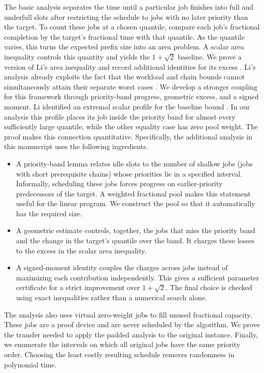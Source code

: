 The basic analysis separates the time until a particular job finishes
into full and underfull slots after restricting the schedule to jobs with
no later priority than the target. To count these jobs at a chosen quantile,
compare each job's fractional completion by the target's fractional time
with that quantile. As the quantile varies, this turns the expected prefix
size into an area problem. A scalar area inequality controls this quantity
and yields the $1+\sqrt2$ baseline. We prove a version of Li's area
inequality and record additional identities for its excess
\cite[Claim~3.3]{Li2017}. Li's analysis already exploits the fact that the workload and chain
bounds cannot simultaneously attain their separate worst cases
\cite[Section~3]{Li2017}. We develop a stronger coupling for this
framework through priority-band progress, geometric excess, and a signed
moment. Li identified an extremal scalar profile for the baseline bound
\cite[Section~3]{Li2017}. In our analysis this profile places its job inside
the priority band for almost every sufficiently large quantile, while the
other equality case has zero pool weight. The proof makes this connection
quantitative.
Specifically, the additional analysis in this manuscript uses
the following ingredients.

\begin{itemize}
\item A priority-band lemma relates idle slots to the number of shallow
jobs (jobs with short prerequisite chains) whose priorities lie in a specified interval. Informally, scheduling
these jobs forces progress on earlier-priority predecessors of the target.
A weighted fractional pool makes this statement useful for the linear
program. We construct the pool so that it automatically has the required size.
\item A geometric estimate controls, together, the jobs that miss the
priority band and the change in the target's quantile over the band. It
charges these losses to the excess in the scalar area inequality.
\item A signed-moment identity couples the charges across jobs instead of
maximizing each contribution independently. This gives a sufficient
parameter certificate for a strict improvement over $1+\sqrt2$. The final
choice is checked using exact inequalities rather than a numerical search
alone.
\end{itemize}

The analysis also uses virtual zero-weight jobs to fill unused fractional
capacity. These jobs are a proof device and are never scheduled by the
algorithm. We prove the transfer needed to apply the padded analysis to
the original instance. Finally, we enumerate the intervals on which all
original jobs have the same priority order. Choosing the least costly
resulting schedule removes randomness in polynomial time.

